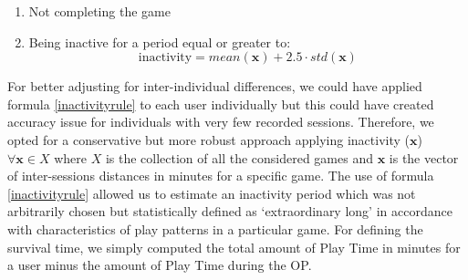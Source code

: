 \begin{enumerate}
    \item Not completing the game
    \item Being inactive for a period equal or greater to:
        \begin{equation}
            \label{inactivityrule}
            \text{inactivity} = 
            mean(\mathbf{x}) + 2.5 \cdot std(\mathbf{x})
        \end{equation}
\end{enumerate}

For better adjusting for inter-individual differences, we could have applied formula \ref{inactivityrule} to each user individually but this could have created accuracy issue for individuals with very few recorded sessions. Therefore, we opted for a conservative but more robust approach applying inactivity ($\mathbf{x}$) $\forall \mathbf{x} \in X$ where $X$ is the collection of all the considered games and $\mathbf{x}$ is the vector of inter-sessions distances in minutes for a specific game. The use of formula \ref{inactivityrule} allowed us to estimate an inactivity period which was not arbitrarily chosen but statistically defined as ‘extraordinary long’ in accordance with characteristics of play patterns in a particular game. For defining the survival time, we simply computed the total amount of Play Time in minutes for a user minus the amount of Play Time during the OP.

\begin{table}[h] \centering
\caption{\textbf{Considered Metrics over Sessions}}
\label{metricsdescription}
\end{table}


